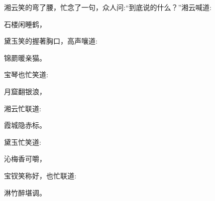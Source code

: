 \begin{parag}
    湘云笑的弯了腰，忙念了一句，众人问:“到底说的什么？”湘云喊道:
\end{parag}


\begin{poem}
    \begin{pl} 石楼闲睡鹤，\end{pl}
\end{poem}


\begin{parag}
    黛玉笑的握著胸口，高声嚷道:
\end{parag}


\begin{poem}
    \begin{pl} 锦罽暖亲猫。\end{pl}
\end{poem}


\begin{parag}
    宝琴也忙笑道:
\end{parag}


\begin{poem}
    \begin{pl} 月窟翻银浪，\end{pl}
\end{poem}


\begin{parag}
    湘云忙联道:
\end{parag}


\begin{poem}
    \begin{pl} 霞城隐赤标。\end{pl}
\end{poem}


\begin{parag}
    黛玉忙笑道:
\end{parag}


\begin{poem}
    \begin{pl} 沁梅香可嚼，\end{pl}
\end{poem}


\begin{parag}
    宝钗笑称好，也忙联道:
\end{parag}


\begin{poem}
    \begin{pl} 淋竹醉堪调。\end{pl}
\end{poem}


